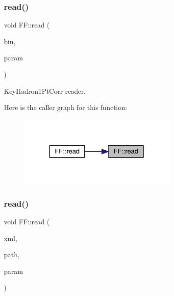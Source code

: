 \subsubsection{\texorpdfstring{read()}{read()}\hspace{0.1cm}{\footnotesize\ttfamily [10/15]}}
{\footnotesize\ttfamily void F\+F\+::read (\begin{DoxyParamCaption}\item[{\mbox{\hyperlink{classADATIO_1_1BinaryReader}{Binary\+Reader}} \&}]{bin,  }\item[{\mbox{\hyperlink{structFF_1_1KeyHadron1PtCorr__t}{Key\+Hadron1\+Pt\+Corr\+\_\+t}} \&}]{param }\end{DoxyParamCaption})}



Key\+Hadron1\+Pt\+Corr reader. 

Here is the caller graph for this function\+:
\nopagebreak
\begin{figure}[H]
\begin{center}
\leavevmode
\includegraphics[width=224pt]{d5/da6/namespaceFF_a09293bf4dc7954334e338c256b1efc75_icgraph}
\end{center}
\end{figure}
\mbox{\label{namespaceFF_a457d1bd921b678eadc34fb2dbfcbdb32}} 
\subsubsection{\texorpdfstring{read()}{read()}\hspace{0.1cm}{\footnotesize\ttfamily [11/15]}}
{\footnotesize\ttfamily void F\+F\+::read (\begin{DoxyParamCaption}\item[{X\+M\+L\+Reader \&}]{xml,  }\item[{const std\+::string \&}]{path,  }\item[{\mbox{\hyperlink{structFF_1_1KeyHadron3PtCorr__t}{Key\+Hadron3\+Pt\+Corr\+\_\+t}} \&}]{param }\end{DoxyParamCaption})}



